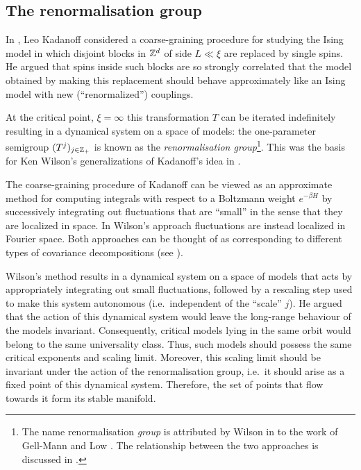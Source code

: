 
\subsection{The renormalisation group}
\label{sec:rg-intro}

In \cite{Kada66}, Leo Kadanoff considered a coarse-graining procedure for
studying the Ising model in which disjoint
blocks in ${ {{\mathbb Z}}^d }$ of side $L \ll \xi$ are replaced by single spins. He argued
that spins inside such blocks are so strongly correlated that the model
obtained by making this replacement should behave approximately like an Ising
model with new (``renormalized'') couplings.

At the critical point, $\xi = \infty$ this transformation
$T$ can be iterated indefinitely resulting in a dynamical system on a space
of models: the one-parameter semigroup $(T^j)_{j\in{\mathbb Z}_+}$ is known as the
\emph{renormalisation group}\footnote{The name renormalisation \emph{group}
is attributed by Wilson in \cite{Wils71I} to the work of Gell-Mann and Low
\cite{GML54}. The relationship between the two approaches is discussed in
\cite{JoLa75}.}. This was the basis for Ken Wilson's
generalizations of Kadanoff's idea in \cite{Wils71I,Wils71II}.

The coarse-graining procedure of Kadanoff can be viewed as an approximate
method for computing integrals with respect to a Boltzmann weight $e^{-\beta H}$
by successively integrating out fluctuations that are ``small'' in the sense
that they are localized in space. In Wilson's approach fluctuations are instead
localized in Fourier space. Both approaches can be thought of
as corresponding to different types of covariance decompositions (see \cite{BCGNOPS78}).

Wilson's method results in a dynamical system on a space of
models that acts by appropriately integrating out small fluctuations, followed
by a rescaling step used to make this system autonomous (i.e.\ independent of
the ``scale'' $j$). He argued that the action of this dynamical system would
leave the long-range behaviour of the models invariant. Consequently, critical models
lying in the same orbit would belong to
the same universality class. Thus, such models should possess the same critical
exponents and scaling limit. Moreover, this scaling limit should be invariant
under the action of the renormalisation group, i.e.\ it should arise as a fixed
point of this dynamical system. Therefore, the set of points that flow towards it
form its stable manifold.

